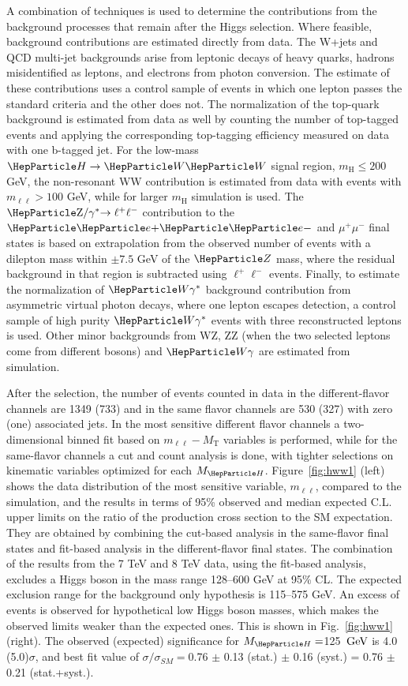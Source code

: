 \documentclass{cimento}
\providecommand{\MT}{\ensuremath{M_{\mathrm{T}}\xspace}}
\newcommand{\mH}{\ensuremath{m_{\mathrm{H}}}\xspace}
\newcommand{\MH}{\ensuremath{M_{\PH}}}
\newcommand{\GeV}{\ensuremath{\,\text{Ge\hspace{-.08em}V}}\xspace}
\newcommand{\cPZ}{\PZ} %
\newcommand{\Lep}{\ensuremath{\mathrm{\ell}}}
\newcommand{\mll}{\ensuremath{m_{\Lep\Lep}}}
\newcommand{\dyll}{\ensuremath{\mathrm{\cPZ}/\gamma^*\mathrm{\to \ell^+\ell^-}}}
\newcommand{\wgamma}{\ensuremath{\PW\gamma}}
\begin{document}
A combination of techniques is used to determine the contributions
from the background processes that remain after the Higgs selection.
Where feasible, background contributions are estimated directly from
data.  The W+jets and QCD multi-jet backgrounds arise from leptonic
decays of heavy quarks, hadrons misidentified as leptons, and
electrons from photon conversion. The estimate of these contributions
uses a control sample of events in which one lepton passes the
standard criteria and the other does not.  The normalization of the
top-quark background is estimated from data as well by counting the
number of top-tagged events and applying the corresponding top-tagging
efficiency measured on data with one b-tagged jet.  For the low-mass
$\PH\to\PW\PW$ signal region, $\mH \leq 200$ GeV, the non-resonant WW
contribution is estimated from data with events with $\mll>100$ GeV,
while for larger $\mH$ simulation is used.  The $\dyll$ contribution
to the $\Pep\Pem$ and $\mu^+\mu^-$ final states is based on
extrapolation from the observed number of events with a dilepton mass
within $\pm7.5$ GeV of the $\cPZ$ mass, where the residual background
in that region is subtracted using $\ell^+\ell^-$ events.  Finally, to
estimate the normalization of $\wgamma^{*}$ background contribution
from asymmetric virtual photon decays, where one lepton escapes
detection, a control sample of high purity $\wgamma^{*}$ events with
three reconstructed leptons is used.  Other minor backgrounds from WZ,
ZZ (when the two selected leptons come from different bosons) and
$\wgamma$ are estimated from simulation.

After the selection, the number of events counted in data in the
different-flavor channels are 1349 (733) and in the same flavor
channels are 530 (327) with zero (one) associated jets. In the most
sensitive different flavor channels a two-dimensional binned fit based
on $\mll-\MT$ variables is performed, while for the same-flavor
channels a cut and count analysis is done, with tighter selections on
kinematic variables optimized for each $\MH$.  Figure~\ref{fig:hww1}
(left) shows the data distribution of the most sensitive variable,
$\mll$, compared to the simulation, and the results in terms of 95\%
observed and median expected C.L. upper limits on the ratio of the
production cross section to the SM expectation. They are obtained by
combining the cut-based analysis in the same-flavor final states and
fit-based analysis in the different-flavor final states.  The
combination of the results from the 7 TeV and 8 TeV data, using the
fit-based analysis, excludes a Higgs boson in the mass range 128--600
GeV at 95\% CL.  The expected exclusion range for the background only
hypothesis is 115--575 GeV.  An excess of events is observed for
hypothetical low Higgs boson masses, which makes the observed limits
weaker than the expected ones. This is shown in Fig.~\ref{fig:hww1}
(right).  The observed (expected) significance for $\MH=$125 \GeV is
4.0 (5.0)$\sigma$, and best fit value of $\sigma/\sigma_{SM}=$0.76
$\pm$ 0.13 (stat.) $\pm$ 0.16 (syst.) = 0.76 $\pm$ 0.21 (stat.+syst.).
\end{document}
